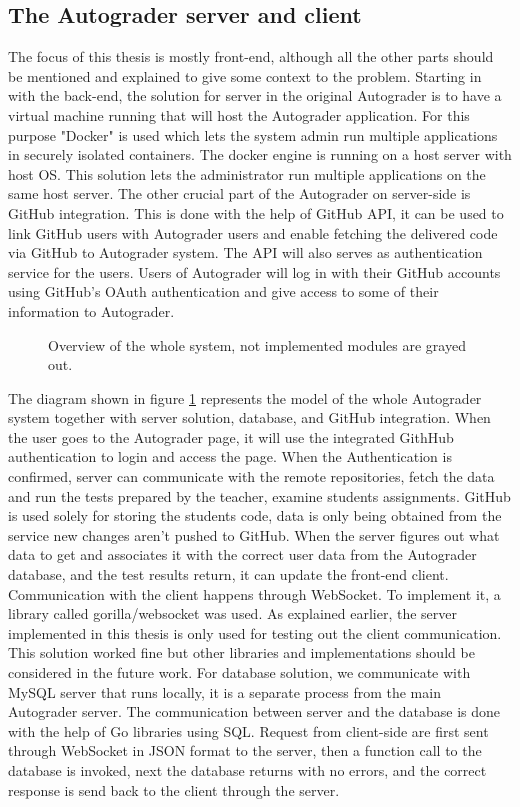 \subsection{The Autograder server and client}
The focus of this thesis is mostly front-end, although all the other parts should be mentioned and explained to give some context to the problem. Starting in with the back-end, the solution for server in the original Autograder is to have a virtual machine running that will host the Autograder application. For this purpose "Docker" \cite{docker} is used which lets the system admin run multiple applications in securely isolated containers. The docker engine is running on a host server with host OS. This solution lets the administrator run multiple applications on the same host server. The other crucial part of the Autograder on server-side is GitHub integration. This is done with the help of GitHub API, it can be used to link GitHub users with Autograder users and enable fetching the delivered code via GitHub to Autograder system. The API will also serves as authentication service for the users. Users of Autograder will log in with their GitHub accounts using GitHub's OAuth authentication \cite{githuboauth} and give access to some of their information to Autograder.

\begin{figure}[h]
  \scalebox{1}{}
  \caption{Overview of the whole system, not implemented modules are grayed out.}
  \label{fig:systemoverview}
\end{figure}

The diagram shown in figure \ref{fig:systemoverview} represents the model of the whole Autograder system together with server solution, database, and GitHub integration. When the user goes to the Autograder page, it will use the integrated GithHub authentication to login and access the page. When the Authentication is confirmed, server can communicate with the remote repositories, fetch the data and run the tests prepared by the teacher, examine students assignments. GitHub is used solely for storing the students code, data is only being obtained from the service new changes aren't pushed to GitHub. When the server figures out what data to get and associates it with the correct user data from the Autograder database, and the test results return, it can update the front-end client.
\\Communication with the client happens through WebSocket. To implement it, a library called gorilla/websocket \cite{gorilla} was used. As explained earlier, the server implemented in this thesis is only used for testing out the client communication. This solution worked fine but other libraries and implementations should be considered in the future work. For database solution, we communicate with MySQL server that runs locally, it is a separate process from the main Autograder server. The communication between server and the database is done with the help of Go libraries using SQL. Request from client-side are first sent through WebSocket in JSON format to the server, then a function call to the database is invoked, next the database returns with no errors, and the correct response is send back to the client through the server.  

